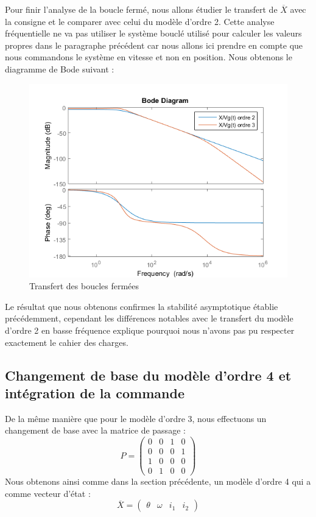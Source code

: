 Pour finir l'analyse de la boucle fermé, nous allons étudier le transfert de $\overline{X}$ avec la consigne et le comparer avec celui du modèle d'ordre 2. Cette analyse fréquentielle ne va pas utiliser le système bouclé utilisé pour calculer les valeurs propres dans le paragraphe précédent car nous allons ici prendre en compte que nous commandons le système en vitesse et non en position. Nous obtenons le diagramme de Bode suivant :
\begin{figure}[!ht]
\includegraphics[scale=1]{./III/figure/bode_Tpert_EE1.png}
\caption{Transfert des boucles fermées\label{fig:transfertX/consigne}}
\end{figure}


Le résultat que nous obtenons confirmes la stabilité asymptotique établie précédemment, cependant les différences notables avec le transfert du modèle d'ordre 2 en basse fréquence explique pourquoi nous n'avons pas pu respecter exactement le cahier des charges. 

\subsection{Changement de base du modèle d'ordre 4 et intégration de la commande\label{sub:observateurSurModelO4}}
De la même manière que pour le modèle d'ordre 3, nous effectuons un changement de base avec la matrice de passage : \begin{equation}
P = \begin{pmatrix}
0 &0& 1& 0\\ 0& 0& 0& 1\\1& 0& 0& 0\\ 0& 1& 0& 0
\end{pmatrix}
\end{equation}
Nous obtenons ainsi comme dans la section précédente, un modèle d'ordre 4 qui a comme vecteur d'état : 
\begin{equation}
\overline{X} = \begin{pmatrix}
\theta & \omega & i_1& i_2
\end{pmatrix}
\end{equation}


